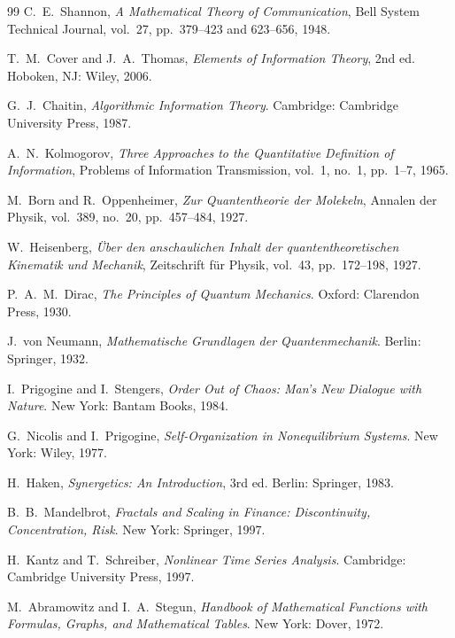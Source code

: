 ﻿\documentclass[12pt, a4paper]{article}
\begin{document}
\begin{thebibliography}{99}
		C.~E.~Shannon,
		\textit{A Mathematical Theory of Communication},
		Bell System Technical Journal, vol.~27, pp.~379--423 and 623--656, 1948.

		T.~M.~Cover and J.~A.~Thomas,
		\textit{Elements of Information Theory}, 2nd ed.
		Hoboken, NJ: Wiley, 2006.

		G.~J.~Chaitin,
		\textit{Algorithmic Information Theory}.
		Cambridge: Cambridge University Press, 1987.

		A.~N.~Kolmogorov,
		\textit{Three Approaches to the Quantitative Definition of Information},
		Problems of Information Transmission, vol.~1, no.~1, pp.~1--7, 1965.

		M.~Born and R.~Oppenheimer,
		\textit{Zur Quantentheorie der Molekeln},
		Annalen der Physik, vol.~389, no.~20, pp.~457--484, 1927.

		W.~Heisenberg,
		\textit{\"{U}ber den anschaulichen Inhalt der quantentheoretischen Kinematik und Mechanik},
		Zeitschrift f\"{u}r Physik, vol.~43, pp.~172--198, 1927.

		P.~A.~M.~Dirac,
		\textit{The Principles of Quantum Mechanics}.
		Oxford: Clarendon Press, 1930.

		J.~von Neumann,
		\textit{Mathematische Grundlagen der Quantenmechanik}.
		Berlin: Springer, 1932.

		I.~Prigogine and I.~Stengers,
		\textit{Order Out of Chaos: Man's New Dialogue with Nature}.
		New York: Bantam Books, 1984.

		G.~Nicolis and I.~Prigogine,
		\textit{Self-Organization in Nonequilibrium Systems}.
		New York: Wiley, 1977.

		H.~Haken,
		\textit{Synergetics: An Introduction}, 3rd ed.
		Berlin: Springer, 1983.

		B.~B.~Mandelbrot,
		\textit{Fractals and Scaling in Finance: Discontinuity, Concentration, Risk}.
		New York: Springer, 1997.

		H.~Kantz and T.~Schreiber,
		\textit{Nonlinear Time Series Analysis}.
		Cambridge: Cambridge University Press, 1997.

		M.~Abramowitz and I.~A.~Stegun,
		\textit{Handbook of Mathematical Functions with Formulas, Graphs, and Mathematical Tables}.
		New York: Dover, 1972.

	\end{thebibliography}
	
\end{document}
